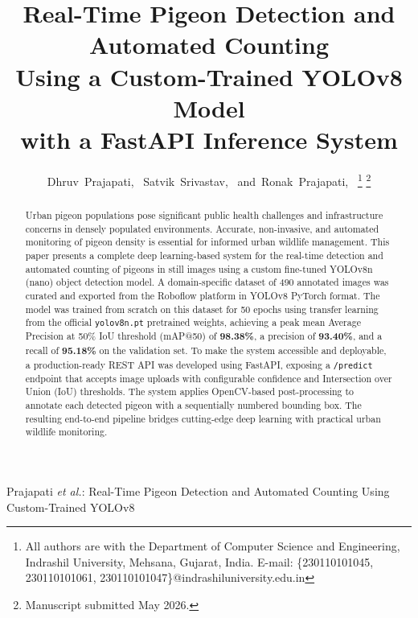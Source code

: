 \documentclass[journal]{IEEEtran}
\begin{document}
\title{Real-Time Pigeon Detection and Automated Counting\\Using a Custom-Trained YOLOv8 Model\\with a FastAPI Inference System}

\author{
  Dhruv~Prajapati,~
  Satvik~Srivastav,~
  and~Ronak~Prajapati,~
  \thanks{All authors are with the Department of Computer Science and Engineering,
    Indrashil University, Mehsana, Gujarat, India.
    E-mail: \{230110101045, 230110101061, 230110101047\}@indrashiluniversity.edu.in}
  \thanks{Manuscript submitted May 2026.}
}

%
{Prajapati \MakeLowercase{\textit{et al.}}: Real-Time Pigeon Detection and Automated Counting Using Custom-Trained YOLOv8}

\maketitle

\begin{abstract}
Urban pigeon populations pose significant public health challenges and infrastructure concerns in densely populated environments. Accurate, non-invasive, and automated monitoring of pigeon density is essential for informed urban wildlife management. This paper presents a complete deep learning-based system for the real-time detection and automated counting of pigeons in still images using a custom fine-tuned YOLOv8n (nano) object detection model. A domain-specific dataset of 490 annotated images was curated and exported from the Roboflow platform in YOLOv8 PyTorch format. The model was trained from scratch on this dataset for 50 epochs using transfer learning from the official \texttt{yolov8n.pt} pretrained weights, achieving a peak mean Average Precision at 50\% IoU threshold (mAP@50) of \textbf{98.38\%}, a precision of \textbf{93.40\%}, and a recall of \textbf{95.18\%} on the validation set. To make the system accessible and deployable, a production-ready REST API was developed using FastAPI, exposing a \texttt{/predict} endpoint that accepts image uploads with configurable confidence and Intersection over Union (IoU) thresholds. The system applies OpenCV-based post-processing to annotate each detected pigeon with a sequentially numbered bounding box. The resulting end-to-end pipeline bridges cutting-edge deep learning with practical urban wildlife monitoring.
\end{abstract}
\end{document}
